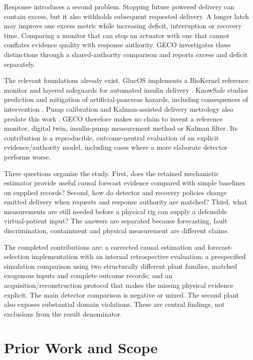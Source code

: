 \documentclass[journal,10pt,letterpaper]{IEEEtran}
\begin{document}
Response introduces a second problem. Stopping future powered delivery
can contain excess, but it also withholds subsequent requested delivery.
A longer latch may improve one excess metric while increasing deficit,
interruption or recovery time. Comparing a monitor that can stop an
actuator with one that cannot conflates evidence quality with response
authority. GECO investigates these distinctions through a
shared-authority comparison and reports excess and deficit separately.

The relevant foundations already exist. GlucOS implements a BioKernel
reference monitor and layered safeguards for automated insulin delivery
\cite{R01}. KnowSafe studies prediction and mitigation of
artificial-pancreas hazards, including consequences of intervention
\cite{R02}. Pump calibration and Kalman-assisted delivery metrology also
predate this work \cite{R03,R04}. GECO therefore makes no claim to
invent a reference monitor, digital twin, insulin-pump measurement
method or Kalman filter. Its contribution is a reproducible,
outcome-neutral evaluation of an explicit evidence/authority model,
including cases where a more elaborate detector performs worse.

Three questions organize the study. First, does the retained mechanistic
estimator provide useful causal forecast evidence compared with simple
baselines on supplied records? Second, how do detector and recovery
policies change emitted delivery when requests and response authority
are matched? Third, what measurements are still needed before a physical
rig can supply a defensible virtual-patient input? The answers are
separated because forecasting, fault discrimination, containment and
physical measurement are different claims.

The completed contributions are: a corrected causal estimation and
forecast-selection implementation with an internal retrospective
evaluation; a prespecified simulation comparison using two structurally
different plant families, matched exogenous inputs and complete outcome
records; and an acquisition/reconstruction protocol that makes the
missing physical evidence explicit. The main detector comparison is
negative or mixed. The second plant also exposes substantial domain
violations. These are central findings, not exclusions from the result
denominator.

\section{Prior Work and Scope}
\end{document}

